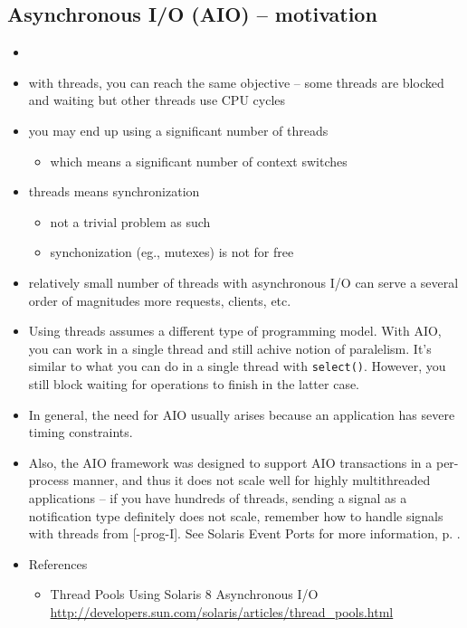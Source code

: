 
\subsection{Asynchronous I/O (AIO) -- motivation}

\begin{itemize}
\item {}
\item with threads, you can reach the same objective -- some threads are blocked
and waiting but other threads use CPU cycles
\item you may end up using a significant number of threads
	\begin{itemize}
	\item which means a significant number of context switches
	\end{itemize}
\item threads means synchronization
	\begin{itemize}
	\item not a trivial problem as such
	\item synchonization (eg., mutexes) is not for free
	\end{itemize}
\item relatively small number of threads with asynchronous I/O can serve a
several order of magnitudes more requests, clients, etc.
\end{itemize}


\begin{itemize}
\item Using threads assumes a different type of programming model. With AIO, you
can work in a single thread and still achive notion of paralelism. It's similar
to what you can do in a single thread with \texttt{select()}. However, you still
block waiting for operations to finish in the latter case.
\item In general, the need for AIO usually arises because an application has
severe timing constraints.
\item Also, the AIO framework was designed to support AIO transactions in a
per-process manner, and thus it does not scale well for highly multithreaded
applications -- if you have hundreds of threads, sending a signal as a
notification type definitely does not scale, remember how to handle signals with
threads from [\myun\myix-prog-I]. See Solaris Event Ports for more information,
p. \pageref{SOLARIS_EVENT_PORTS}.
\item References
	\begin{itemize}
	\item Thread Pools Using Solaris 8 Asynchronous I/O
	\url{http://developers.sun.com/solaris/articles/thread\_pools.html}
	\end{itemize}
\end{itemize}

